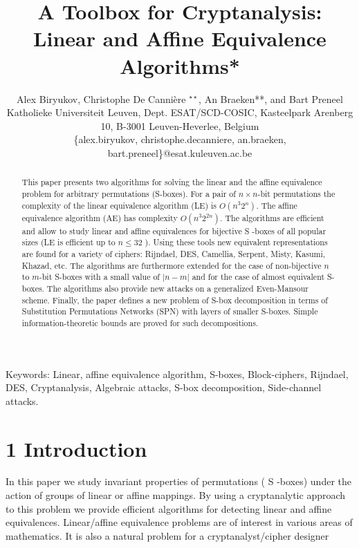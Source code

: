 \documentclass[10pt]{article}
\title{A Toolbox for Cryptanalysis: Linear and Affine Equivalence Algorithms* }
\author{Alex Biryukov, Christophe De Cannière ${ }^{\star \star}$, An Braeken**, and Bart Preneel\\
Katholieke Universiteit Leuven, Dept. ESAT/SCD-COSIC, Kasteelpark Arenberg 10, B-3001 Leuven-Heverlee, Belgium\\
\{alex.biryukov, christophe.decanniere, an.braeken, bart.preneel\}@esat.kuleuven.ac.be}
\date{}
\begin{document}
\maketitle
\captionsetup{singlelinecheck=false}


\begin{abstract}
This paper presents two algorithms for solving the linear and the affine equivalence problem for arbitrary permutations (S-boxes). For a pair of $n \times n$-bit permutations the complexity of the linear equivalence algorithm (LE) is $O\left(n^{3} 2^{n}\right)$. The affine equivalence algorithm (AE) has complexity $O\left(n^{3} 2^{2 n}\right)$. The algorithms are efficient and allow to study linear and affine equivalences for bijective S -boxes of all popular sizes (LE is efficient up to $n \leq 32$ ). Using these tools new equivalent representations are found for a variety of ciphers: Rijndael, DES, Camellia, Serpent, Misty, Kasumi, Khazad, etc. The algorithms are furthermore extended for the case of non-bijective $n$ to $m$-bit S-boxes with a small value of $|n-m|$ and for the case of almost equivalent S-boxes. The algorithms also provide new attacks on a generalized Even-Mansour scheme. Finally, the paper defines a new problem of S-box decomposition in terms of Substitution Permutations Networks (SPN) with layers of smaller S-boxes. Simple information-theoretic bounds are proved for such decompositions.
\end{abstract}

Keywords: Linear, affine equivalence algorithm, S-boxes, Block-ciphers, Rijndael, DES, Cryptanalysis, Algebraic attacks, S-box decomposition, Side-channel attacks.

\section*{1 Introduction}
In this paper we study invariant properties of permutations ( S -boxes) under the action of groups of linear or affine mappings. By using a cryptanalytic approach to this problem we provide efficient algorithms for detecting linear and affine equivalences. Linear/affine equivalence problems are of interest in various areas of mathematics. It is also a natural problem for a cryptanalyst/cipher designer
\end{document}
